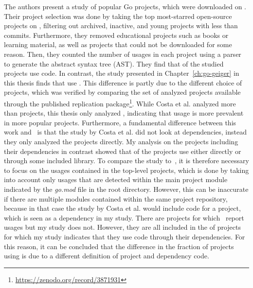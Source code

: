 The authors present a study of  popular Go projects, which were downloaded on
.
Their project selection was done by taking the top  most-starred open-source projects on \github{},
filtering out archived, inactive, and young projects with less than  commits.
Furthermore, they removed educational projects such as books or learning material, as well as projects that could not be
downloaded for some reason.
Then, they counted the number of \unsafe{} usages in each project using a parser to generate the abstract syntax tree
(\acrshort{AST}).
They find that  of the studied projects use \unsafe{} code.
In contrast, the study presented in Chapter~\ref{ch:go-geiger} in this thesis finds that \percentageUnsafeProjects{}
use \unsafe{}.
This difference is partly due to the different choice of projects, which was verified by comparing the set of analyzed
projects available through the published replication package\footnote{\url{https://zenodo.org/record/3871931}}.
While Costa et al. analyzed more than  projects, this thesis only analyzed \projsAnalyzed{}, indicating
that \unsafe{} usage is more prevalent in more popular projects.
Furthermore, a fundamental difference between this work and~\cite{costa2020} is that the study by Costa et al. did not
look at dependencies, instead they only analyzed the projects directly.
My analysis on the projects including their dependencies in contrast showed that
\percentageUnsafeTransitiveWithDependencies{} of the projects use \unsafe{} either directly or through some included
library.
To compare the study to~\cite{costa2020}, it is therefore necessary to focus on the \unsafe{} usages contained in the
top-level projects, which is done by taking into account only usages that are detected within the main project module
indicated by the \textit{go.mod} file in the root directory.
However, this can be inaccurate if there are multiple modules contained within the same project repository, because in
that case the study by Costa et al. would include code for a project, which is seen as a dependency in my study.
There are  projects for which~\cite{costa2020} report \unsafe{} usages  but my study does not.
However, they are all included in the \percentageUnsafeTransitiveWithDependencies{} of projects for which my study
indicates that they use \unsafe{} code through their dependencies.
For this reason, it can be concluded that the difference in the fraction of projects using \unsafe{} is due to a
different definition of project and dependency code.

